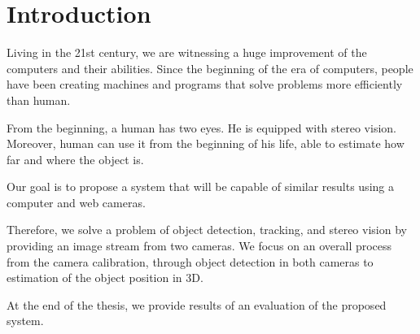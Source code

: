 \chapter*{Introduction}

Living in the 21st century, we are witnessing a huge improvement of the
computers and their abilities. Since the beginning of the era of computers,
people have been creating machines and programs that solve problems more
efficiently than human.

From the beginning, a human has two eyes. He is equipped with stereo vision.
Moreover, human can use it from the beginning of his life, able to estimate how
far and where the object is.

Our goal is to propose a system that will be capable of similar results using a
computer and web cameras.

Therefore, we solve a problem of object detection, tracking, and stereo vision
by providing an image stream from two cameras. We focus on an overall process
from the camera calibration, through object detection in both cameras to
estimation of the object position in 3D.

At the end of the thesis, we provide results of an evaluation of the proposed
system.
